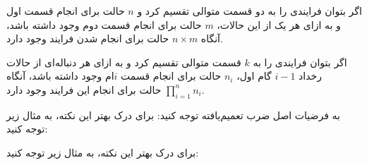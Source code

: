 \begin{DEFINITION}
    \p
    اگر بتوان فرایندی را به دو قسمت متوالی تقسیم کرد و
    $n$
    حالت برای انجام قسمت اول و به ازای هر یک از این حالات،
    $m$
    حالت برای انجام قسمت دوم وجود داشته باشد،
    آنگاه
    $n \times m$
    حالت برای انجام شدن فرایند وجود دارد.
\end{DEFINITION}
    
\begin{THEOREM}
    \p
    اگر بتوان فرایندی را به
    $k$
    قسمت متوالی تقسیم کرد و
    به ازای هر دنباله‌ای از حالات رخداد $i-1$ گام اول،
    $n_i$
    حالت برای انجام قسمت
    $i$ام
    وجود داشته باشد،
    آنگاه
    $\prod\limits_{i=1}^n n_i$
    حالت برای انجام این فرایند وجود دارد.
\end{THEOREM}



\p
به فرضیات اصل ضرب تعمیم‌یافته توجه کنید:
\p
برای درک بهتر این نکته، به مثال زیر توجه کنید:


\p
برای درک بهتر این نکته، به مثال زیر توجه کنید:




